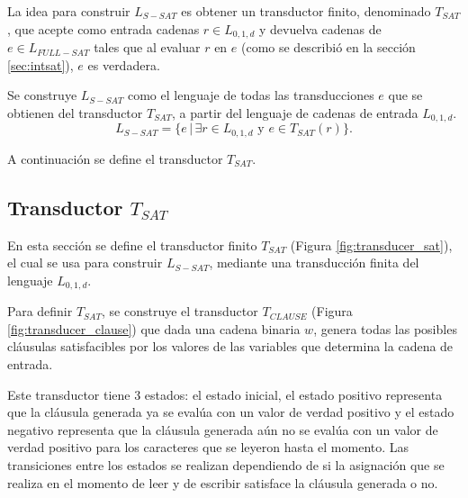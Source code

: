\documentclass[12pt]{article}
\begin{document}
La idea para construir $L_{S-SAT}$ es obtener un transductor finito, denominado $T_{SAT}$, que acepte como
entrada cadenas $r\in L_{0,1,d}$ y devuelva cadenas de $e\in L_{FULL-SAT}$ tales que al evaluar $r$ en $e$
(como se describió en la sección \ref{sec:intsat}), $e$ es verdadera.

Se construye $L_{S-SAT}$ como el lenguaje de todas las transducciones $e$ que se obtienen del transductor
$T_{SAT}$, a partir del lenguaje de cadenas de entrada $L_{0,1,d}$.
$$L_{S-SAT} = \{e\,|\,\exists r \in L_{0,1,d} \text{ y } e \in T_{SAT}(r) \}.$$

A continuación se define el transductor $T_{SAT}$.

\subsection{Transductor $T_{SAT}$}
\label{sec:tsat}

En esta sección se define el transductor finito $T_{SAT}$ (Figura \ref{fig:transducer_sat}), el cual se usa para construir $L_{S-SAT}$, mediante una transducción finita del lenguaje $L_{0,1,d}$.

Para definir $T_{SAT}$, se construye el transductor $T_{CLAUSE}$ (Figura \ref{fig:transducer_clause}) que
dada una cadena binaria $w$, genera todas las posibles cláusulas satisfacibles por los valores de las
variables que determina la cadena de entrada. 

Este transductor tiene 3 estados: el estado inicial, el estado positivo representa que la cláusula generada 
ya se evalúa con un valor de verdad positivo y el estado negativo representa que la cláusula generada aún no 
se evalúa con un valor de verdad positivo para los caracteres que se leyeron hasta el momento. Las transiciones 
entre los estados se realizan dependiendo de si la asignación que se realiza en el momento de leer y de escribir 
satisface la cláusula generada o no.
\end{document}
